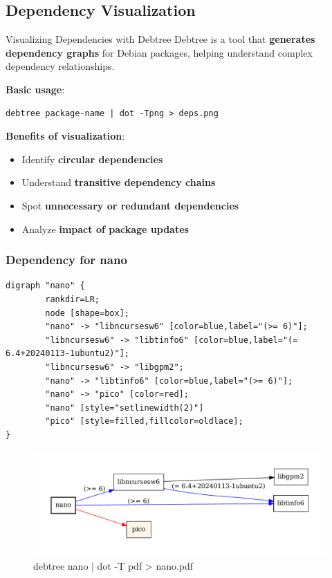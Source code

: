 \documentclass{beamer}
\begin{document}
\subsection{Dependency Visualization}

\begin{frame}[t,fragile]{Visualizing Dependencies with Debtree}
Debtree is a tool that \textbf{generates dependency graphs} for Debian packages, helping understand complex dependency relationships.

\bigskip

\textbf{Basic usage}:
\begin{verbatim}
debtree package-name | dot -Tpng > deps.png
\end{verbatim}

\bigskip

\textbf{Benefits of visualization}:
\begin{itemize}
\item Identify \textbf{circular dependencies}
\item Understand \textbf{transitive dependency chains}
\item Spot \textbf{unnecessary or redundant dependencies}
\item Analyze \textbf{impact of package updates}
\end{itemize}

\end{frame}

\begin{frame}[t,fragile]
    \frametitle{Dependency for nano}

    \tiny
    \begin{verbatim}
digraph "nano" {
        rankdir=LR;
        node [shape=box];
        "nano" -> "libncursesw6" [color=blue,label="(>= 6)"];
        "libncursesw6" -> "libtinfo6" [color=blue,label="(= 6.4+20240113-1ubuntu2)"];
        "libncursesw6" -> "libgpm2";
        "nano" -> "libtinfo6" [color=blue,label="(>= 6)"];
        "nano" -> "pico" [color=red];
        "nano" [style="setlinewidth(2)"]
        "pico" [style=filled,fillcolor=oldlace];
}
\end{verbatim}
    
    \begin{figure}
    \begin{center}
        \includegraphics[width=.5\textwidth]{images/nano.pdf}
    \end{center}
    \caption{debtree nano | dot -T pdf > nano.pdf}
    \end{figure}
    
\end{frame}
\end{document}
